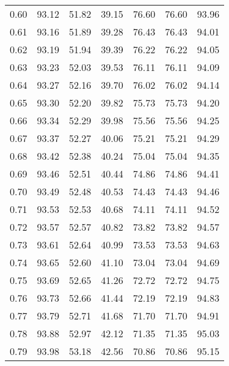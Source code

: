 \begin{tabular}{|c|c|c|c|c|c|c|}
      0.60 &     93.12 &     51.82 &      39.15 &   76.60 &      76.60 &         93.96 \\
      0.61 &     93.16 &     51.89 &      39.28 &   76.43 &      76.43 &         94.01 \\
      0.62 &     93.19 &     51.94 &      39.39 &   76.22 &      76.22 &         94.05 \\
      0.63 &     93.23 &     52.03 &      39.53 &   76.11 &      76.11 &         94.09 \\
      0.64 &     93.27 &     52.16 &      39.70 &   76.02 &      76.02 &         94.14 \\
      0.65 &     93.30 &     52.20 &      39.82 &   75.73 &      75.73 &         94.20 \\
      0.66 &     93.34 &     52.29 &      39.98 &   75.56 &      75.56 &         94.25 \\
      0.67 &     93.37 &     52.27 &      40.06 &   75.21 &      75.21 &         94.29 \\
      0.68 &     93.42 &     52.38 &      40.24 &   75.04 &      75.04 &         94.35 \\
      0.69 &     93.46 &     52.51 &      40.44 &   74.86 &      74.86 &         94.41 \\
      0.70 &     93.49 &     52.48 &      40.53 &   74.43 &      74.43 &         94.46 \\
      0.71 &     93.53 &     52.53 &      40.68 &   74.11 &      74.11 &         94.52 \\
      0.72 &     93.57 &     52.57 &      40.82 &   73.82 &      73.82 &         94.57 \\
      0.73 &     93.61 &     52.64 &      40.99 &   73.53 &      73.53 &         94.63 \\
      0.74 &     93.65 &     52.60 &      41.10 &   73.04 &      73.04 &         94.69 \\
      0.75 &     93.69 &     52.65 &      41.26 &   72.72 &      72.72 &         94.75 \\
      0.76 &     93.73 &     52.66 &      41.44 &   72.19 &      72.19 &         94.83 \\
      0.77 &     93.79 &     52.71 &      41.68 &   71.70 &      71.70 &         94.91 \\
      0.78 &     93.88 &     52.97 &      42.12 &   71.35 &      71.35 &         95.03 \\
      0.79 &     93.98 &     53.18 &      42.56 &   70.86 &      70.86 &         95.15 \\

\end{tabular}
